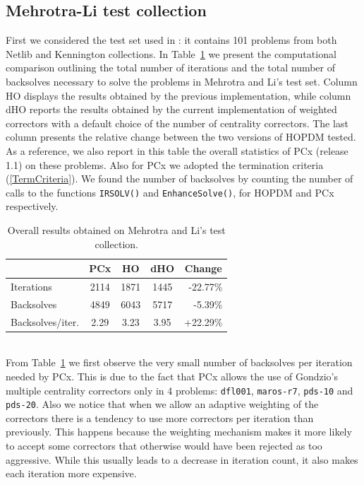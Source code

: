%
%
\subsection{Mehrotra-Li test collection}
\label{ML-tests}

First we considered the test set used in \cite{MehrotraLi}: 
it contains 101 problems from both Netlib and Kennington collections. 
%
In Table~\ref{MLtotals} we present the computational comparison 
outlining the total number of iterations and the total number 
of backsolves necessary to solve the problems in Mehrotra and Li's test set. 
Column HO displays the results obtained
by the previous implementation, while column dHO reports
the results obtained by the current implementation of weighted
correctors with a default choice of the number of centrality correctors. 
The last column presents the relative change between the two 
versions of HOPDM tested. 
As a reference, we also report in this table the overall
statistics of PCx (release 1.1) on these problems. Also for PCx we adopted
the termination criteria (\ref{TermCriteria}).
We found the number of backsolves by counting the number of calls 
to the functions {\tt IRSOLV()} and {\tt EnhanceSolve()}, for HOPDM and
PCx respectively.
%
\begin{table}[ht]
  \centering
  \begin{tabular}{|l|c||c|c|r|}\cline{2-5}
    \multicolumn{1}{c|}{}& PCx & HO & dHO &\multicolumn{1}{c|}{Change}\\ \hline
    Iterations       & 2114 & 1871  & 1445           &   -22.77\% \\ 
    Backsolves       & 4849 & 6043  & 5717           &   -5.39\%  \\
    Backsolves/iter. & 2.29 & 3.23  & 3.95           &   +22.29\% \\ \hline
  \end{tabular}
  \caption{Overall results obtained on Mehrotra and Li's test collection.}
  \label{MLtotals}
\end{table}
%
\\From Table~\ref{MLtotals} we first observe the very small number 
of backsolves per iteration needed by PCx. This is due to the fact 
that PCx allows the use of Gondzio's multiple centrality correctors 
only in 4 problems: {\tt dfl001}, {\tt maros-r7}, {\tt pds-10} and 
{\tt pds-20}.
%
Also we notice that when we allow an adaptive weighting 
of the correctors there is a tendency to use more correctors 
per iteration than previously. 
This happens because the weighting mechanism makes it more likely
to accept some correctors that otherwise would have been rejected
as too aggressive.
While this usually leads to a decrease 
in iteration count, it also makes each iteration more expensive.


